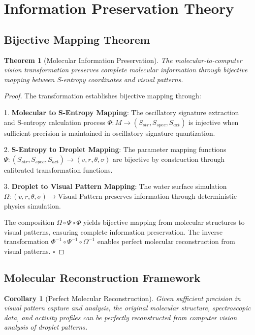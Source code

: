 \documentclass[12pt,a4paper]{article}
\newtheorem{theorem}{Theorem}
\newtheorem{corollary}{Corollary}
\begin{document}
\section{Information Preservation Theory}

\subsection{Bijective Mapping Theorem}

\begin{theorem}[Molecular Information Preservation]
The molecular-to-computer vision transformation preserves complete molecular information through bijective mapping between S-entropy coordinates and visual patterns.
\end{theorem}

\begin{proof}
The transformation establishes bijective mapping through:

1. \textbf{Molecular to S-Entropy Mapping}: The oscillatory signature extraction and S-entropy calculation process $\Phi: M \rightarrow (S_{str}, S_{spec}, S_{act})$ is injective when sufficient precision is maintained in oscillatory signature quantization.

2. \textbf{S-Entropy to Droplet Mapping}: The parameter mapping functions $\Psi: (S_{str}, S_{spec}, S_{act}) \rightarrow (v, r, \theta, \sigma)$ are bijective by construction through calibrated transformation functions.

3. \textbf{Droplet to Visual Pattern Mapping}: The water surface simulation $\Omega: (v, r, \theta, \sigma) \rightarrow \text{Visual Pattern}$ preserves information through deterministic physics simulation.

The composition $\Omega \circ \Psi \circ \Phi$ yields bijective mapping from molecular structures to visual patterns, ensuring complete information preservation. The inverse transformation $\Phi^{-1} \circ \Psi^{-1} \circ \Omega^{-1}$ enables perfect molecular reconstruction from visual patterns. $\square$
\end{proof}

\subsection{Molecular Reconstruction Framework}

\begin{corollary}[Perfect Molecular Reconstruction]
Given sufficient precision in visual pattern capture and analysis, the original molecular structure, spectroscopic data, and activity profiles can be perfectly reconstructed from computer vision analysis of droplet patterns.
\end{corollary}
\end{document}
